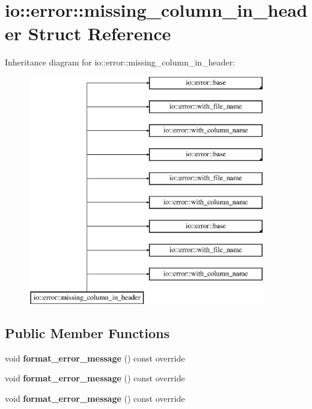 \hypertarget{structio_1_1error_1_1missing__column__in__header}{}\section{io\+:\+:error\+:\+:missing\+\_\+column\+\_\+in\+\_\+header Struct Reference}
\label{structio_1_1error_1_1missing__column__in__header}
Inheritance diagram for io\+:\+:error\+:\+:missing\+\_\+column\+\_\+in\+\_\+header\+:\begin{figure}[H]
\begin{center}
\leavevmode
\includegraphics[height=10.000000cm]{d1/d8a/structio_1_1error_1_1missing__column__in__header}
\end{center}
\end{figure}
\subsection*{Public Member Functions}
\begin{DoxyCompactItemize}
\item 
\mbox{\label{structio_1_1error_1_1missing__column__in__header_a9c1f09597f9d51865d780d4d8bf851d7}} 
void {\bfseries format\+\_\+error\+\_\+message} () const override
\item 
\mbox{\label{structio_1_1error_1_1missing__column__in__header_a9c1f09597f9d51865d780d4d8bf851d7}} 
void {\bfseries format\+\_\+error\+\_\+message} () const override
\item 
\mbox{\label{structio_1_1error_1_1missing__column__in__header_a9c1f09597f9d51865d780d4d8bf851d7}} 
void {\bfseries format\+\_\+error\+\_\+message} () const override
\end{DoxyCompactItemize}
